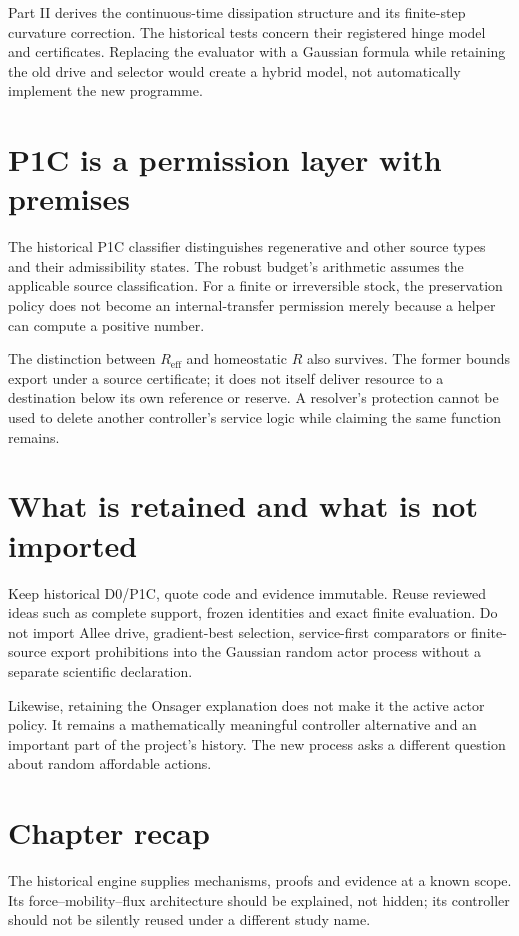 Part II derives the continuous-time dissipation structure and its finite-step
curvature correction. The historical tests concern their registered hinge
model and certificates. Replacing the evaluator with a Gaussian formula
while retaining the old drive and selector would create a hybrid model,
not automatically implement the new programme.

\section{P1C is a permission layer with premises}
The historical P1C classifier distinguishes regenerative and other source
types and their admissibility states. The robust budget's arithmetic assumes
the applicable source classification. For a finite or irreversible stock,
the preservation policy does not become an internal-transfer permission
merely because a helper can compute a positive number.

The distinction between $R_{\mathrm{eff}}$ and homeostatic $R$ also survives.
The former bounds export under a source certificate; it does not itself
deliver resource to a destination below its own reference or reserve. A
resolver's protection cannot be used to delete another controller's service
logic while claiming the same function remains.

\section{What is retained and what is not imported}
Keep historical D0/P1C, quote code and evidence immutable. Reuse reviewed
ideas such as complete support, frozen identities and exact finite
evaluation. Do not import Allee drive, gradient-best selection, service-first
comparators or finite-source export prohibitions into the Gaussian random
actor process without a separate scientific declaration.

Likewise, retaining the Onsager explanation does not make it the active
actor policy. It remains a mathematically meaningful controller alternative
and an important part of the project's history. The new process asks a
different question about random affordable actions.

\section*{Chapter recap}
The historical engine supplies mechanisms, proofs and evidence at a known
scope. Its force--mobility--flux architecture should be explained, not hidden;
its controller should not be silently reused under a different study name.
